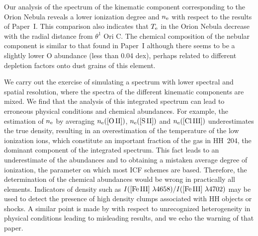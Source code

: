\documentclass[twocolumn,linenumbers]{aastex63}
\begin{document}
Our analysis of the spectrum of the kinematic component corresponding to the Orion Nebula reveals a lower ionization degree and $n_{\rm e}$  with respect to the results of Paper~I. This comparison also indicates that $T_{\rm e}$ in the Orion Nebula decrease with the radial distance from $\theta^{1} \text{ Ori C}$. The chemical composition of the nebular component is similar to that found in Paper~I although there seems to be a slightly lower O abundance (less than 0.04 dex), perhaps related to different depletion factors onto dust grains of this element.

We carry out the exercise of simulating a spectrum with lower spectral and spatial resolution, where the spectra of the different kinematic components are mixed. We find that the analysis of this integrated spectrum can lead to erroneous physical conditions and chemical abundances. For example, the estimation of $n_{\rm e}$ by averaging $n_{\rm e} \text{([O\thinspace II])}$, $n_{\rm e} \text{([S\thinspace II])}$ and $n_{\rm e} \text{([Cl\thinspace III])}$ underestimates the true density, resulting in an overestimation of the temperature of the low ionization ions, which constitute an important fraction of the gas in HH~204, the dominant component of the integrated spectrum. This fact leads to an underestimate of the abundances and to obtaining a mistaken average degree of ionization, the parameter on which most ICF schemes are based. Therefore, the determination of the chemical abundances would be wrong in practically all elements. Indicators of density such as  $I(\text{[Fe\thinspace III] } \lambda 4658)/I(\text{[Fe\thinspace III] } \lambda 4702)$ may be used to detect the presence of high density clumps associated with HH objects or shocks. 
A similar point is made by \citet{ODell:2021l} with respect to unrecognized heterogeneity in physical conditions leading to misleading results, and we echo the warning of that paper.
\end{document}
